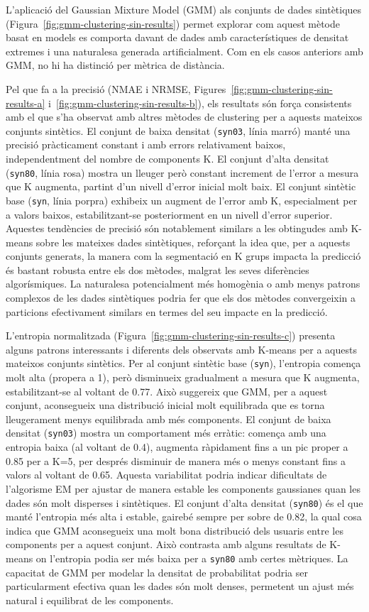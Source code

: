 \documentclass[a4paper,12pt]{report}
\begin{document}
L'aplicació del Gaussian Mixture Model (GMM) als conjunts de dades sintètiques (Figura~\ref{fig:gmm-clustering-sin-results}) permet explorar com aquest mètode basat en models es comporta davant de dades amb característiques de densitat extremes i una naturalesa generada artificialment. Com en els casos anteriors amb GMM, no hi ha distinció per mètrica de distància.

Pel que fa a la precisió (NMAE i NRMSE, Figures~\ref{fig:gmm-clustering-sin-results-a} i~\ref{fig:gmm-clustering-sin-results-b}), els resultats són força consistents amb el que s'ha observat amb altres mètodes de clustering per a aquests mateixos conjunts sintètics. El conjunt de baixa densitat (\texttt{syn03}, línia marró) manté una precisió pràcticament constant i amb errors relativament baixos, independentment del nombre de components K. El conjunt d'alta densitat (\texttt{syn80}, línia rosa) mostra un lleuger però constant increment de l'error a mesura que K augmenta, partint d'un nivell d'error inicial molt baix. El conjunt sintètic base (\texttt{syn}, línia porpra) exhibeix un augment de l'error amb K, especialment per a valors baixos, estabilitzant-se posteriorment en un nivell d'error superior. Aquestes tendències de precisió són notablement similars a les obtingudes amb K-means sobre les mateixes dades sintètiques, reforçant la idea que, per a aquests conjunts generats, la manera com la segmentació en K grups impacta la predicció és bastant robusta entre els dos mètodes, malgrat les seves diferències algorísmiques. La naturalesa potencialment més homogènia o amb menys patrons complexos de les dades sintètiques podria fer que els dos mètodes convergeixin a particions efectivament similars en termes del seu impacte en la predicció.

L'entropia normalitzada (Figura~\ref{fig:gmm-clustering-sin-results-c}) presenta alguns patrons interessants i diferents dels observats amb K-means per a aquests mateixos conjunts sintètics. Per al conjunt sintètic base (\texttt{syn}), l'entropia comença molt alta (propera a 1), però disminueix gradualment a mesura que K augmenta, estabilitzant-se al voltant de 0.77. Això suggereix que GMM, per a aquest conjunt, aconsegueix una distribució inicial molt equilibrada que es torna lleugerament menys equilibrada amb més components. El conjunt de baixa densitat (\texttt{syn03}) mostra un comportament més erràtic: comença amb una entropia baixa (al voltant de 0.4), augmenta ràpidament fins a un pic proper a 0.85 per a K=5, per després disminuir de manera més o menys constant fins a valors al voltant de 0.65. Aquesta variabilitat podria indicar dificultats de l'algorisme EM per ajustar de manera estable les components gaussianes quan les dades són molt disperses i sintètiques. El conjunt d'alta densitat (\texttt{syn80}) és el que manté l'entropia més alta i estable, gairebé sempre per sobre de 0.82, la qual cosa indica que GMM aconsegueix una molt bona distribució dels usuaris entre les components per a aquest conjunt. Això contrasta amb alguns resultats de K-means on l'entropia podia ser més baixa per a \texttt{syn80} amb certes mètriques. La capacitat de GMM per modelar la densitat de probabilitat podria ser particularment efectiva quan les dades són molt denses, permetent un ajust més natural i equilibrat de les components.
\end{document}
